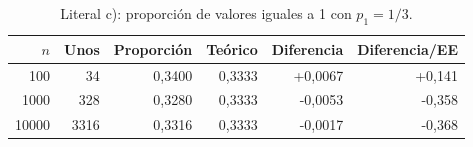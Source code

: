 \begin{table}[H]
\centering
\caption{Literal c): proporci\'on de valores iguales a 1 con $p_1 = 1/3$.}
\label{tab:53c}
\small
\begin{tabular}{@{}rrrrrr@{}}
\toprule
$n$ & Unos & Proporci\'on & Te\'orico & Diferencia & Diferencia/EE \\
\midrule
100 & 34 & 0,3400 & 0,3333 & +0,0067 & +0,141 \\
1000 & 328 & 0,3280 & 0,3333 & -0,0053 & -0,358 \\
10000 & 3316 & 0,3316 & 0,3333 & -0,0017 & -0,368 \\
\bottomrule
\end{tabular}
\end{table}